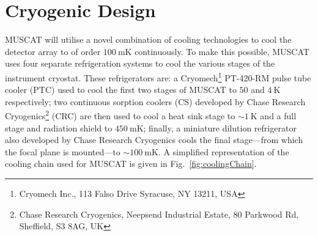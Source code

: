 \documentclass{spie}
\begin{document}
\section{Cryogenic Design}
MUSCAT will utilise a novel combination of cooling technologies to cool the detector array to of order $100~\si{\milli\kelvin}$ continuously. To make this possible, MUSCAT uses four separate refrigeration systems to cool the various stages of the instrument cryostat. These refrigerators are: a Cryomech\footnote{Cryomech Inc., 113 Falso Drive Syracuse, NY 13211, USA} PT-420-RM pulse tube cooler (PTC) used to cool the first two stages of MUSCAT to $50$ and $4~\si{\kelvin}$ respectively; two continuous sorption coolers (CS) developed by Chase Research Cryogenics\footnote{Chase Research Cryogenics, Neepsend Industrial Estate, 80 Parkwood Rd, Sheffield, S3 8AG, UK} (CRC) are then used to cool a heat sink stage to $\sim 1~\si{\kelvin}$ and a full stage and radiation shield to $450~\si{\milli\kelvin}$; finally, a miniature dilution refrigerator also developed by Chase Research Cryogenics cools the final stage---from which the focal plane is mounted---to $\sim 100~\si{\milli\kelvin}$. A simplified representation of the cooling chain used for MUSCAT is given in Fig.~\ref{fig:coolingChain}.
\end{document}
